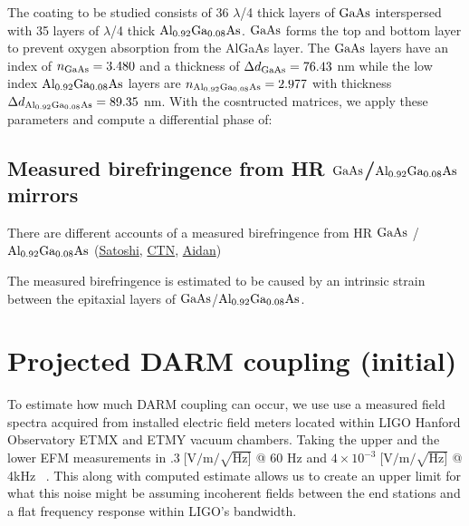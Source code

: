 The coating to be studied consists of 36 $\lambda$/4  thick layers of $\mathrm{GaAs}$ interspersed with 35 layers of $\lambda$/4 thick $\mathrm{Al_{0.92}Ga_{0.08}As}$. $\mathrm{GaAs}$ forms the top and bottom layer to prevent oxygen absorption from the AlGaAs layer. The $\mathrm{GaAs}$ layers have an index of $n_{\mathrm{GaAs}} = 3.480$ and a thickness of $\Delta d_{\mathrm{GaAs}} = 76.43$ nm while the low index $\mathrm{Al_{0.92}Ga_{0.08}As}$ layers are $n_{\mathrm{Al_{0.92}Ga_{0.08}As}} = 2.977$ with thickness $\Delta d_{\mathrm{Al_{0.92}Ga_{0.08}As}} = 89.35$ nm. With the cosntructed matrices, we apply these parameters and compute a differential phase of:



\subsection{Measured birefringence from HR $\mathrm{GaAs}$/$\mathrm{Al_{0.92}Ga_{0.08}As}$ mirrors}

There are different accounts of a measured birefringence from HR $\mathrm{GaAs}$ / $\mathrm{Al_{0.92}Ga_{0.08}As}$ (\href{https://dcc.ligo.org/DocDB/0181/G2200386/001/G2200386.pdf}{Satoshi}, \href{https://nodus.ligo.caltech.edu:8081/CTN/1474}{CTN}, \href{https://dcc.ligo.org/DocDB/0181/G2200559/001/G2200559-v1%20-%20polarization.pdf}{Aidan})


The measured birefringence is estimated to be caused by an intrinsic strain between the epitaxial layers of $\mathrm{GaAs}$/$\mathrm{Al_{0.92}Ga_{0.08}As}$. \cite{Cole:2013}


\section{Projected DARM coupling (initial)}
To estimate how much DARM coupling can occur, we use use a measured field spectra acquired from installed electric field meters located within LIGO Hanford Observatory ETMX and ETMY vacuum chambers. Taking the upper and the lower EFM measurements in $.3\; [\mathrm{V}/\mathrm{m}/\sqrt{\mathrm{Hz}]}$ @ 60 Hz and $4\times10^{-3}\; [\mathrm{V}/\mathrm{m}/\sqrt{\mathrm{Hz}]}$ @ 4kHz ~\cite{efmlog}.
This along with computed estimate allows us to create an upper limit for what this noise might be assuming incoherent fields between the end stations and a flat frequency response within LIGO's bandwidth.

